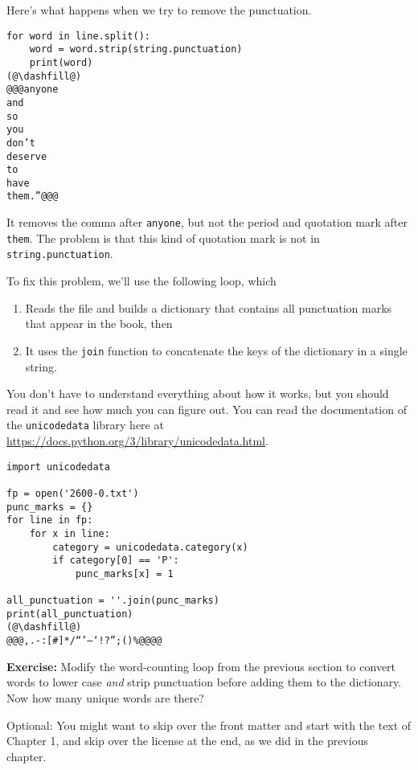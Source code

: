 Here's what happens when we try to remove the punctuation.

\begin{lstlisting}[]
for word in line.split():
    word = word.strip(string.punctuation)
    print(word)
(@\dashfill@)
@@@anyone
and
so
you
don’t
deserve
to
have
them.”@@@
\end{lstlisting}

It removes the comma after \passthrough{\lstinline!anyone!}, but not the
period and quotation mark after \passthrough{\lstinline!them!}. The
problem is that this kind of quotation mark is not in
\passthrough{\lstinline!string.punctuation!}.

To fix this problem, we'll use the following loop, which

\begin{enumerate}
\def\labelenumi{\arabic{enumi}.}
\item
  Reads the file and builds a dictionary that contains all punctuation
  marks that appear in the book, then
\item
  It uses the \passthrough{\lstinline!join!} function to concatenate the
  keys of the dictionary in a single string.
\end{enumerate}

You don't have to understand everything about how it works, but you
should read it and see how much you can figure out. You can read the
documentation of the \passthrough{\lstinline!unicodedata!} library here
at \url{https://docs.python.org/3/library/unicodedata.html}.

\begin{lstlisting}[]
import unicodedata

fp = open('2600-0.txt')
punc_marks = {}
for line in fp:
    for x in line:
        category = unicodedata.category(x)
        if category[0] == 'P':
            punc_marks[x] = 1
        
all_punctuation = ''.join(punc_marks)
print(all_punctuation)
(@\dashfill@)
@@@,.-:[#]*/“’—‘!?”;()%@@@@
\end{lstlisting}

\textbf{Exercise:} Modify the word-counting loop from the previous
section to convert words to lower case \emph{and} strip punctuation
before adding them to the dictionary. Now how many unique words are
there?

Optional: You might want to skip over the front matter and start with
the text of Chapter 1, and skip over the license at the end, as we did
in the previous chapter.

